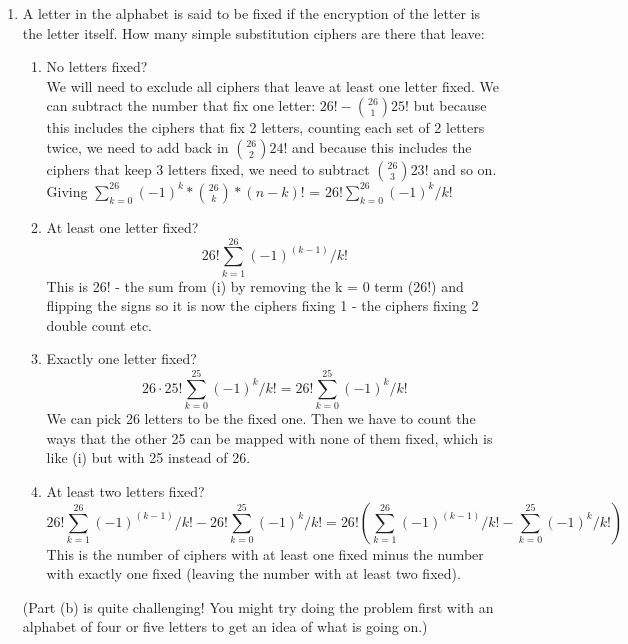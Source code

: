 \documentclass[12pt]{amsart}
\theoremstyle{definition}
\begin{document}
\begin{enumerate}
\begin{enumerate}
			\item  A letter in the alphabet is said to be fixed if the encryption of the letter is the
				letter itself. How many simple substitution ciphers are there that leave:
		
			\begin{enumerate}
				\item No letters fixed? 
				\\ We will need to exclude all ciphers that leave at least one letter fixed. We can subtract the number that fix one letter: $26! - {26 \choose 1} 25!$ 
				but because this includes the ciphers that fix 2 letters, counting each set of 2 letters twice, we need to add back in ${26 \choose 2}24!$ and because this includes
				the ciphers that keep 3 letters fixed, we need to subtract ${26 \choose 3}23!$ and so on. 
				Giving $\sum_{k=0}^{26}{(-1)^k * {26 \choose k}*(n-k)!}$ = $26!\sum_{k=0}^{26}{(-1)^k/ k!}$

				\item At least one letter fixed?  $$26!\sum_{k=1}^{26}{(-1)^{(k-1)}/k!}$$
				This is 26! - the sum from (i) by removing the k = 0 term (26!) and flipping the signs so it is now the ciphers fixing 1 - the ciphers fixing 2 double count etc. \\
				\item Exactly one letter fixed?
				$$26 \cdot 25!\sum_{k=0}^{25}{(-1)^k/ k!} = 26!\sum_{k=0}^{25}{(-1)^k/ k!}$$
				We can pick 26 letters to be the fixed one. Then we have to count the ways that the other 25 can be mapped with none of them fixed, which is like (i) but with 25 instead of 26.\\
				\item At least two letters fixed?
				$$26!\sum_{k=1}^{26}{(-1)^{(k-1)}/k!} - 26!\sum_{k=0}^{25}{(-1)^k/ k!} = 26!(\sum_{k=1}^{26}{(-1)^{(k-1)}/k!} - \sum_{k=0}^{25}{(-1)^k/ k!}) $$
				This is the number of ciphers with at least one fixed minus the number with exactly one fixed (leaving the number with at least two fixed).\\
				
			\end{enumerate}
			(Part (b) is quite challenging! You might try doing the problem first with an alphabet 
			of four or five letters to get an idea of what is going on.)
		\end{enumerate}
\end{enumerate}
\end{document}
